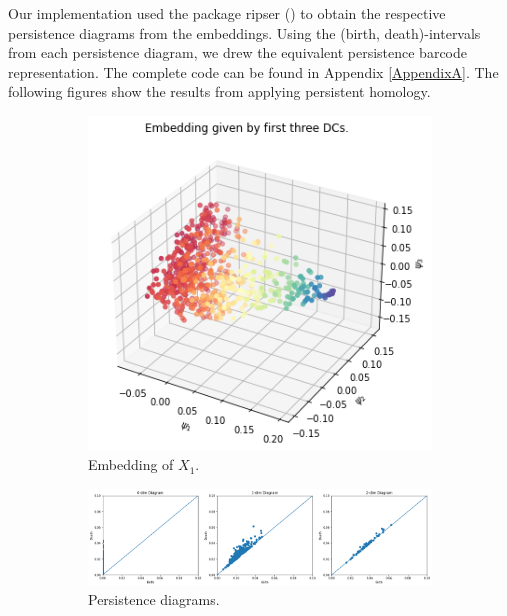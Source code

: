 Our implementation used the package ripser (\cite{ctralie2018ripser}) to obtain the respective persistence diagrams from the embeddings. Using the (birth, death)-intervals from each persistence diagram, we drew the equivalent persistence barcode representation. The complete code can be found in Appendix \ref{AppendixA}. The following figures show the results from applying persistent homology.
\begin{figure}[H]
\centering
\begin{subfigure}[b]{0.2\textwidth}
    \includegraphics[width=\textwidth]{figures/topology/X1_embedding.png}
    \caption{Embedding of $X_1$.}
\end{subfigure}
\hfill
\begin{subfigure}[b]{0.75\textwidth}
    \includegraphics[width=\textwidth]{figures/topology/X1_H0.png}
    \caption{Persistence diagrams.}
\end{subfigure}
\begin{subfigure}[b]{0.25\textwidth}

\end{subfigure}
\end{figure}
